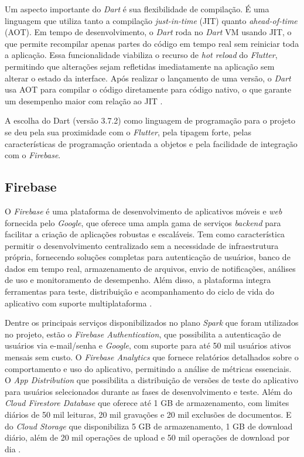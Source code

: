 Um aspecto importante do \textit{Dart} é sua flexibilidade de compilação. 
É uma linguagem que utiliza tanto a compilação \textit{just-in-time} 
(JIT) quanto \textit{ahead-of-time} (AOT). 
Em tempo de desenvolvimento, o \textit{Dart} roda no \textit{Dart} VM 
usando JIT, o que permite recompilar apenas partes 
do código em tempo real sem reiniciar toda a aplicação. Essa funcionalidade 
viabiliza o recurso de \textit{hot reload} do \textit{Flutter}, permitindo 
que alterações sejam refletidas imediatamente na aplicação sem alterar o 
estado da interface.
Após realizar o lançamento de uma versão, o \textit{Dart} usa AOT para compilar o código diretamente 
para código nativo, o que garante um desempenho maior com relação ao JIT \cite{dartDocs2025}.

A escolha do Dart (versão 3.7.2) como linguagem de programação para o projeto se deu pela sua
proximidade com o \textit{Flutter}, pela tipagem forte, pelas características de 
programação orientada a objetos e pela facilidade de integração com o \textit{Firebase}.

\subsection{Firebase}

O \textit{Firebase} é uma plataforma de desenvolvimento de aplicativos móveis e \textit{web} 
fornecida pelo \textit{Google}, que oferece uma ampla gama de serviços \textit{backend} para 
facilitar a criação de aplicações robustas e escaláveis. Tem como característica 
permitir o desenvolvimento centralizado sem a necessidade de infraestrutura própria, 
fornecendo soluções completas para autenticação de usuários, banco de dados em tempo real, 
armazenamento de arquivos, envio de notificações, análises de uso e monitoramento de 
desempenho. Além disso, a plataforma integra ferramentas para teste, distribuição 
e acompanhamento do ciclo de vida do aplicativo com suporte multiplataforma \cite{firebase2025}.

Dentre os principais serviços disponibilizados no plano \textit{Spark} que foram 
utilizados no projeto, estão o \textit{Firebase Authentication}, 
que possibilita a autenticação de usuários via e-mail/senha e \textit{Google}, com suporte 
para até 50 mil usuários ativos mensais sem custo. O \textit{Firebase Analytics} que fornece 
relatórios detalhados sobre o comportamento e uso do aplicativo, permitindo a 
análise de métricas essenciais. O \textit{App Distribution} que possibilita a distribuição de versões 
de teste do aplicativo para usuários selecionados durante as fases de desenvolvimento e teste. 
Além do \textit{Cloud Firestore Database} que oferece até 1 GB de armazenamento, com limites diários de 50 
mil leituras, 20 mil gravações e 20 mil exclusões de documentos. E do \textit{Cloud Storage} que
disponibiliza 5 GB de armazenamento, 1 GB de download diário, além de 20 mil operações 
de upload e 50 mil operações de download por dia \cite{firebase2025}.

